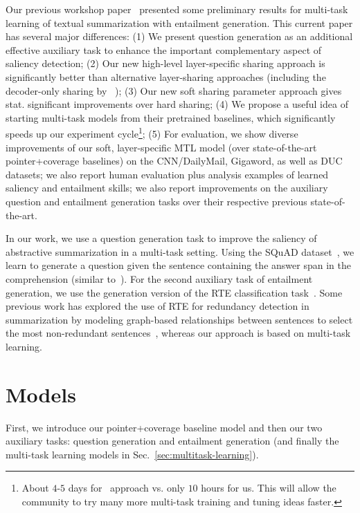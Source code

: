 \documentclass[11pt,a4paper]{article}
\begin{document}
Our previous workshop paper~\cite{Pasunuru2017TowardsIA} presented some preliminary results for multi-task learning of textual summarization with entailment generation. This current paper has several major differences: 
(1) We present question generation as an additional effective auxiliary task to enhance the important complementary aspect of saliency detection;
(2) Our new high-level layer-specific sharing approach is significantly better than alternative layer-sharing approaches (including the decoder-only sharing by ~);
(3) Our new soft sharing parameter approach gives stat. significant improvements over hard sharing;
(4) We propose a useful idea of starting multi-task models from their pretrained baselines, which significantly speeds up our experiment cycle\footnote{About $4$-$5$ days for~ approach vs. only $10$ hours for us. This will allow the community to try many more multi-task training and tuning ideas faster.};
(5) For evaluation, we show diverse improvements of our soft, layer-specific MTL model (over state-of-the-art pointer+coverage baselines) on the CNN/DailyMail, Gigaword, as well as DUC datasets; we also report human evaluation plus analysis examples of learned saliency and entailment skills; we also report improvements on the auxiliary question and entailment generation tasks over their respective previous state-of-the-art.




In our work, we use a question generation task to improve the saliency of abstractive summarization in a multi-task setting. Using the SQuAD dataset~\cite{rajpurkar2016squad}, we learn to generate a question given the sentence containing the answer span in the comprehension (similar to~).
For the second auxiliary task of entailment generation, we use the generation version of the RTE classification task~\cite{dagan2006pascal,lai2014illinois,jimenez2014unal,bowman2015large}. Some previous work has explored the use of RTE for redundancy detection in summarization by modeling graph-based relationships between sentences to select the most non-redundant sentences~\cite{mehdad2013abstractive,gupta2014text}, whereas our approach is based on multi-task learning.
 
\section{Models}

First, we introduce our pointer+coverage baseline model and then our two auxiliary tasks: question generation and entailment generation (and finally the multi-task learning models in Sec.~\ref{sec:multitask-learning}). 
\end{document}
